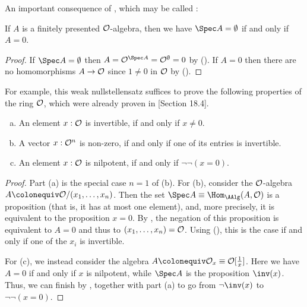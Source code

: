 An important consequence of , which may be called :

\begin{proposition}%
  \label{weak-nullstellensatz}
  If $A$ is a finitely presented $\mathcal O$-algebra,
  then we have $\Spec A=\emptyset$ if and only if $A=0$.
\end{proposition}

\begin{proof}
  If $\Spec A = \emptyset$
  then $A = \A^{\Spec A} = \A^\emptyset = 0$
  by ().
  If $A = 0$
  then there are no homomorphisms $A \to \mathcal O$
  since $1 \neq 0$ in $\mathcal O$ by ().
\end{proof}

For example, this weak nullstellensatz suffices
to prove the following properties of the ring $\mathcal O$,
which were already proven in
\cite{ingo-thesis}[Section 18.4].

\begin{proposition}%
  \label{nilpotence-double-negation}\label{non-zero-invertible}\label{generalized-field-property}
  
  \begin{enumerate}[(a)]
  \item An element $x:\mathcal O$ is invertible,
    if and only if $x\neq 0$.
  \item A vector $x:\mathcal O^n$ is non-zero,
    if and only if one of its entries is invertible.
  \item An element $x:\mathcal O$ is nilpotent,
    if and only if $\neg \neg (x=0)$.
  \end{enumerate}
\end{proposition}

\begin{proof}
  Part (a) is the special case $n = 1$ of (b).
  For (b),
  consider the $\mathcal O$-algebra $A \colonequiv \A/(x_1, \dots, x_n)$.
  Then the set $\Spec A \equiv \Hom_{\AAlg}(A, \A)$
  is a proposition (that is, it has at most one element),
  and, more precisely, it is equivalent to the proposition $x = 0$.
  By ,
  the negation of this proposition is equivalent to $A = 0$
  and thus to $(x_1, \dots, x_n) = \mathcal O$.
  Using (),
  this is the case if and only if one of the $x_i$ is invertible.

  For (c),
  we instead consider the algebra $A \colonequiv \A_x \equiv \A[\frac{1}{x}]$.
  Here we have $A = 0$ if and only if $x$ is nilpotent,
  while $\Spec A$ is the proposition $\inv(x)$.
  Thus, we can finish by ,
  together with part (a) to go from $\lnot \inv(x)$ to $\lnot \lnot (x = 0)$.
\end{proof}

